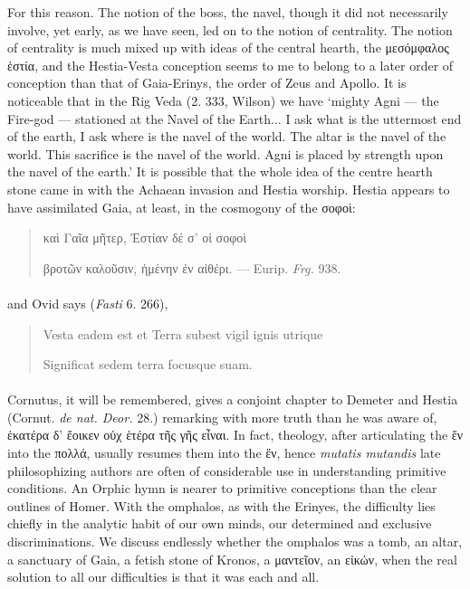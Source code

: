 \documentclass[a4paper, 11pt, oneside, polutonikogreek, english]{article}
\begin{document}
For this reason. The notion of the boss, the navel, though it did not necessarily involve, yet early, as we have seen, led on to the notion of centrality. The notion of centrality is much mixed up with ideas of the central hearth, the μεσόμφαλος ἑστία, and the Hestia-Vesta conception seems to me to belong to a later order of conception than that of Gaia-Erinys, the order of Zeus and Apollo. It is noticeable that in the Rig Veda (2. 333, Wilson) we have `mighty Agni --- the Fire-god --- stationed at the Navel of the Earth... I ask what is the uttermost end of the earth, I ask where is the navel of the world. The altar is the navel of the world. This sacrifice is the navel of the world. Agni is placed by strength upon the navel of the earth.' It is possible that the whole idea of the centre hearth stone came in with the Achaean invasion and Hestia worship. Hestia appears to have assimilated Gaia, at least, in the cosmogony of the σοφοὶ:
\begin{quotation}
\large
καὶ Γαῖα μῆτερ, Ἐστίαν δέ σ' οἱ σοφοὶ

βροτῶν καλοῦσιν, ἡμένην ἐν αἰθέρι. --- Eurip. \emph{Frg.} 938.
\end{quotation}
\paragraph{}
and Ovid says (\emph{Fasti} 6. 266),
\begin{quotation}
\large
Vesta eadem est et Terra subest vigil ignis utrique

Significat sedem terra focusque suam.
\end{quotation}
\paragraph{}
Cornutus, it will be remembered, gives a conjoint chapter to Demeter and Hestia (Cornut. \emph{de nat. Deor.} 28.) remarking with more truth than he was aware of, ἑκατέρα δ' ἔοικεν οὐχ ἑτέρα τῆς γῆς εἶναι. In fact, theology, after articulating the ἕν into the πολλά, usually resumes them into the ἕν, hence \emph{mutatis mutandis} late philosophizing authors are often of considerable use in understanding primitive conditions. An Orphic hymn is nearer to primitive conceptions than the clear outlines of Homer. With the omphalos, as with the Erinyes, the difficulty lies chiefly in the analytic habit of our own minds, our determined and exclusive discriminations. We discuss endlessly whether the omphalos was a tomb, an altar, a sanctuary of Gaia, a fetish stone of Kronos, a μαντεῖον, an εἰκών, when the real solution to all our difficulties is that it was each and all.
\end{document}
